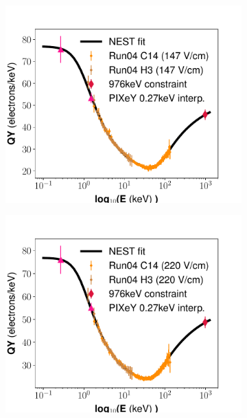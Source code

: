 \begin{figure}[h!]
\centering
\begin{subfigure}{0.5\textwidth}
  \centering
  \includegraphics[width=\textwidth]{Figures/Yields_fit_old/NEST_fit_147Vcm_old.pdf}
  \caption{}
\end{subfigure}%
\begin{subfigure}{0.5\textwidth}
  \centering
  \includegraphics[width=\textwidth]{Figures/Yields_fit_old/NEST_fit_220Vcm_old.pdf}
  \caption{}
\end{subfigure}

\end{figure}
